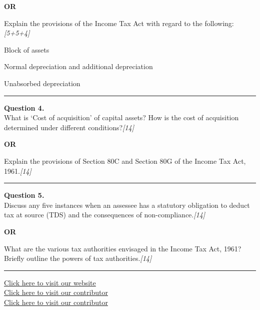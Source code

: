 \documentclass[11pt,a4paper]{article}
\newcommand{\pts}[1]{\hfill   \textit{[#1]}}
\begin{document}
\centerline{   \textbf{OR}}

Explain the provisions of the Income Tax Act with regard to the following:\pts{5+5+4}

\begin{parts}
  \item Block of assets
  \item Normal depreciation and additional depreciation
  \item Unabsorbed depreciation
\end{parts}

\medskip\rule{\linewidth}{0.2pt}

\pagebreak




\noindent   \textbf{Question 4.} \\
What is `Cost of acquisition' of capital assets? How is the cost of acquisition determined under different conditions?\pts{14}

\centerline{   \textbf{OR}}

Explain the provisions of Section 80C and Section 80G of the Income Tax Act, 1961.\pts{14}

\medskip\rule{\linewidth}{0.2pt}




\noindent   \textbf{Question 5.} \\
Discuss any five instances when an assessee has a statutory obligation to deduct tax at source (TDS) and the consequences of non-compliance.\pts{14}

\centerline{   \textbf{OR}}

What are the various tax authorities envisaged in the Income Tax Act, 1961? Briefly outline the powers of tax authorities.\pts{14}

\vfill
\rule{\linewidth}{0.4pt}

\begin{center}\small
\href{https://bhu-exam.vercel.app/}{Click here to visit our website}\\[4pt]
\href{https://me-aryan.vercel.app/}{Click here to visit our contributor}\\[4pt]
\href{https://quashan-me.vercel.app/}{Click here to visit our contributor}
\end{center}
\end{document}
